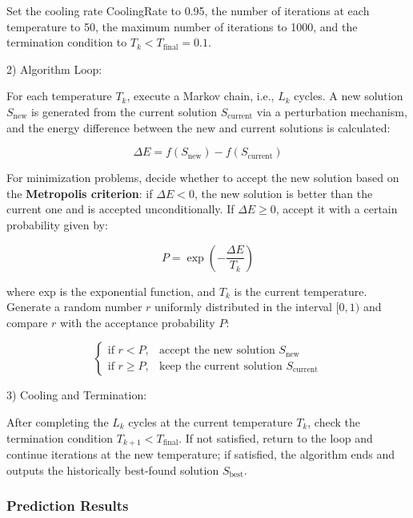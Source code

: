 \documentclass{article}
\begin{document}
		Set the cooling rate CoolingRate to 0.95, the number of iterations at each temperature to 50, the maximum number of iterations to 1000, and the termination condition to \(T_k < T_{\text{final}} = 0.1\).
		
		2) Algorithm Loop:
		
		For each temperature \(T_k\), execute a Markov chain, i.e., \(L_k\) cycles. A new solution \(S_{\text{new}}\) is generated from the current solution \(S_{\text{current}}\) via a perturbation mechanism, and the energy difference between the new and current solutions is calculated:
		
		\begin{equation}
		\Delta E = f(S_{\text{new}}) - f(S_{\text{current}})
		\end{equation}
		
		For minimization problems, decide whether to accept the new solution based on the \textbf{Metropolis criterion}: if \(\Delta E < 0\), the new solution is better than the current one and is accepted unconditionally. If \(\Delta E \geq 0\), accept it with a certain probability given by:
		
		\begin{equation}
		P = \exp\left(-\frac{\Delta E}{T_k}\right)
		\end{equation}
		
		where exp is the exponential function, and \(T_k\) is the current temperature. Generate a random number \(r\) uniformly distributed in the interval \([0,1)\) and compare \(r\) with the acceptance probability \(P\):
		
		\[
		\begin{cases}
			\text{if } r < P, & \text{accept the new solution } S_{\text{new}} \\
			\text{if } r \geq P, & \text{keep the current solution } S_{\text{current}}
		\end{cases}
		\]
		
		3) Cooling and Termination:
		
		After completing the \(L_k\) cycles at the current temperature \(T_k\), check the termination condition \(T_{k+1} < T_{\text{final}}\). If not satisfied, return to the loop and continue iterations at the new temperature; if satisfied, the algorithm ends and outputs the historically best-found solution \(S_{\text{best}}\).
		
		\subsubsection{Prediction Results}
		
\end{document}
